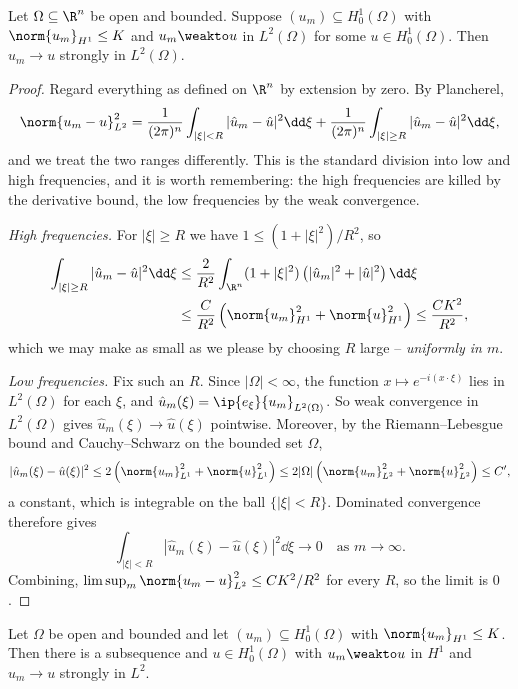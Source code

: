 \begin{theorem}\label{thm:rellich}
	Let $\Omega\subseteq\R^n$ be open and bounded. Suppose $(u_m)\subseteq H_0^1(\Omega)$ with $\norm{u_m}_{H^1}\le K$ and $u_m\weakto u$ in $L^2(\Omega)$ for some $u \in H_0^1(\Omega)$. Then $u_m\to u$ strongly in $L^2(\Omega)$.
\end{theorem}

\begin{proof}
	Regard everything as defined on $\R^n$ by extension by zero. By Plancherel,
	$$\norm{u_m-u}_{L^2}^2=\frac{1}{(2\pi)^n}\int_{|\xi|<R}|\hat u_m-\hat u|^2\dd\xi+\frac{1}{(2\pi)^n}\int_{|\xi|\ge R}|\hat u_m-\hat u|^2\dd\xi,$$
	and we treat the two ranges differently. This is the standard division into low and high frequencies, and it is worth remembering: the high frequencies are killed by the derivative bound, the low frequencies by the weak convergence.

	\emph{High frequencies.} For $|\xi|\ge R$ we have $1 \le (1+|\xi|^2)/R^2$, so
	\begin{align*}
		\int_{|\xi|\ge R}|\hat u_m-\hat u|^2\dd\xi &\le\frac{2}{R^2}\int_{\R^n}(1+|\xi|^2)\left(|\hat u_m|^2+|\hat u|^2\right)\dd\xi \\
		&\le\frac{C}{R^2}\left(\norm{u_m}^2_{H^1}+\norm{u}^2_{H^1}\right)\le\frac{CK^2}{R^2},
	\end{align*}
	which we may make as small as we please by choosing $R$ large -- \emph{uniformly in $m$}.

	\emph{Low frequencies.} Fix such an $R$. Since $|\Omega|<\infty$, the function $x\mapsto e^{-i(x\cdot\xi)}$ lies in $L^2(\Omega)$ for each $\xi$, and $\hat u_m(\xi)=\ip{e_\xi}{u_m}_{L^2(\Omega)}$. So weak convergence in $L^2(\Omega)$ gives $\hat u_m(\xi)\to\hat u(\xi)$ pointwise. Moreover, by the Riemann--Lebesgue bound and Cauchy--Schwarz on the bounded set $\Omega$,
	$$|\hat u_m(\xi)-\hat u(\xi)|^2\le2\left(\norm{u_m}^2_{L^1}+\norm{u}^2_{L^1}\right)\le2|\Omega|\left(\norm{u_m}^2_{L^2}+\norm{u}^2_{L^2}\right)\le C',$$
	a constant, which is integrable on the ball $\{|\xi|<R\}$. Dominated convergence therefore gives
	$$\int_{|\xi|<R}|\hat u_m(\xi)-\hat u(\xi)|^2\dd\xi\longrightarrow 0 \quad\text{as } m \to\infty.$$
	Combining, $\limsup_m\norm{u_m-u}^2_{L^2}\le CK^2/R^2$ for every $R$, so the limit is $0$.
\end{proof}

\begin{corollary}\label{cor:rellichseq}
	Let $\Omega$ be open and bounded and let $(u_m)\subseteq H_0^1(\Omega)$ with $\norm{u_m}_{H^1}\le K$. Then there is a subsequence and $u \in H_0^1(\Omega)$ with $u_m\weakto u$ in $H^1$ and $u_m \to u$ strongly in $L^2$.
\end{corollary}

